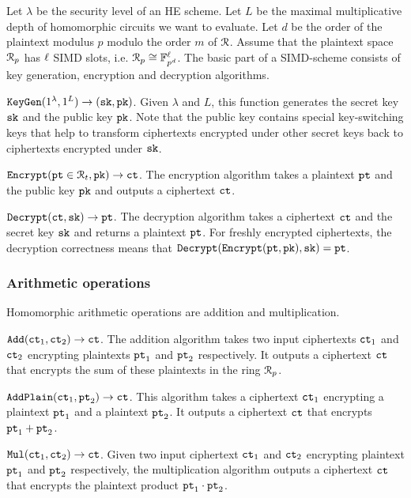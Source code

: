 Let $\lambda$ be the security level of an HE scheme.
Let $L$ be the maximal multiplicative depth of homomorphic circuits we want to evaluate.
Let $d$ be the order of the plaintext modulus $p$ modulo the order $m$ of $\mathcal{R}$.
Assume that the plaintext space $\mathcal{R}_p$ has $\ell$ SIMD slots, i.e. $\mathcal{R}_p \cong \mathbb{F}^\ell_{p^d}$.
The basic part of a SIMD-scheme consists of key generation, encryption and decryption algorithms.

${\mathtt{KeyGen}}(1^\lambda, 1^L) \rightarrow ({\mathtt{sk}}, {\mathtt{pk}})$. Given $\lambda$ and $L$, this function generates the secret key ${\mathtt{sk}}$ and the public key ${\mathtt{pk}}$.
Note that the public key contains special key-switching keys that help to transform ciphertexts encrypted under other secret keys back to ciphertexts encrypted under ${\mathtt{sk}}$. 

${\mathtt{Encrypt}}({\mathtt{pt}} \in \mathcal{R}_t, {\mathtt{pk}}) \rightarrow {\mathtt{ct}}$. The encryption algorithm takes a plaintext ${\mathtt{pt}}$ and the public key ${\mathtt{pk}}$ and outputs a ciphertext ${\mathtt{ct}}$.

${\mathtt{Decrypt}}({\mathtt{ct}}, {\mathtt{sk}}) \rightarrow {\mathtt{pt}}$. The decryption algorithm takes a ciphertext ${\mathtt{ct}}$ and the secret key ${\mathtt{sk}}$ and returns a plaintext ${\mathtt{pt}}$.
For freshly encrypted ciphertexts, the decryption correctness means that ${\mathtt{Decrypt}}({\mathtt{Encrypt}}({\mathtt{pt}}, {\mathtt{pk}}), {\mathtt{sk}}) = {\mathtt{pt}}$. 


\subsubsection{Arithmetic operations}

Homomorphic arithmetic operations are addition and multiplication.

${\mathtt{Add}}({\mathtt{ct}}_1, {\mathtt{ct}}_2) \rightarrow {\mathtt{ct}}$. The addition algorithm takes two input ciphertexts ${\mathtt{ct}}_1$ and ${\mathtt{ct}}_2$ encrypting plaintexts ${\mathtt{pt}}_1$ and ${\mathtt{pt}}_2$ respectively.
It outputs a ciphertext ${\mathtt{ct}}$ that encrypts the sum of these plaintexts in the ring $\mathcal{R}_p$.

${\mathtt{AddPlain}}({\mathtt{ct}}_1, {\mathtt{pt}}_2) \rightarrow {\mathtt{ct}}$. This algorithm takes a ciphertext ${\mathtt{ct}}_1$ encrypting a plaintext ${\mathtt{pt}}_1$ and a plaintext ${\mathtt{pt}}_2$.
It outputs a ciphertext ${\mathtt{ct}}$ that encrypts ${\mathtt{pt}}_1 + {\mathtt{pt}}_2$.

${\mathtt{Mul}}({\mathtt{ct}}_1, {\mathtt{ct}}_2) \rightarrow {\mathtt{ct}}$. Given two input ciphertext ${\mathtt{ct}}_1$ and ${\mathtt{ct}}_2$ encrypting plaintext ${\mathtt{pt}}_1$ and ${\mathtt{pt}}_2$ respectively, the multiplication algorithm outputs a ciphertext ${\mathtt{ct}}$ that encrypts the plaintext product ${\mathtt{pt}}_1 \cdot {\mathtt{pt}}_2$.

